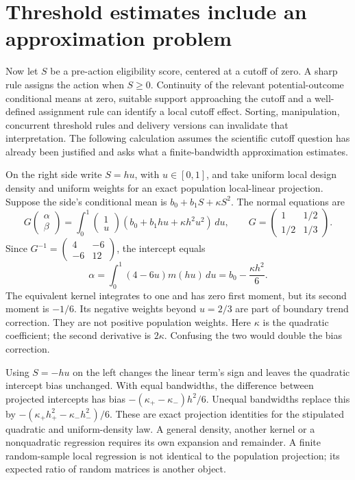 \section{Threshold estimates include an approximation problem}
\label{exec17:s4-curvature}

Now let $S$ be a pre-action eligibility score, centered at a cutoff of zero.
A sharp rule assigns the action when $S\geq0$. Continuity of the relevant
potential-outcome conditional means at zero, suitable support approaching
the cutoff and a well-defined assignment rule can identify a local cutoff
effect. Sorting, manipulation, concurrent threshold rules and delivery
versions can invalidate that interpretation. The following calculation
assumes the scientific cutoff question has already been justified and asks
what a finite-bandwidth approximation estimates.

On the right side write $S=hu$, with $u\in[0,1]$, and take uniform local
design density and uniform weights for an exact population local-linear
projection. Suppose the side's conditional mean is
$b_0+b_1S+\kappa S^2$. The normal equations are
\[
 G\begin{pmatrix}\alpha\\\beta\end{pmatrix}
 =\int_0^1\begin{pmatrix}1\\u\end{pmatrix}
       (b_0+b_1hu+\kappa h^2u^2)\,du,
 \qquad
 G=\begin{pmatrix}1&1/2\\1/2&1/3\end{pmatrix}.
\]
Since $G^{-1}=\left(\begin{smallmatrix}4&-6\\-6&12\end{smallmatrix}\right)$,
the intercept equals
\begin{equation}
 \alpha=\int_0^1(4-6u)m(hu)\,du
        =b_0-\frac{\kappa h^2}{6}.
 \label{exec17:s4-local-bias}
\end{equation}
The equivalent kernel integrates to one and has zero first moment, but its
second moment is $-1/6$. Its negative weights beyond $u=2/3$ are part of
boundary trend correction. They are not positive population weights.
Here $\kappa$ is the quadratic coefficient; the second derivative is
$2\kappa$. Confusing the two would double the bias correction.
\citep{exec17_s4_math}

Using $S=-hu$ on the left changes the linear term's sign and leaves the
quadratic intercept bias unchanged. With equal bandwidths, the difference
between projected intercepts has bias
$-(\kappa_+-\kappa_-)h^2/6$. Unequal bandwidths replace this by
$-(\kappa_+h_+^2-\kappa_-h_-^2)/6$. These are exact projection identities
for the stipulated quadratic and uniform-density law. A general density,
another kernel or a nonquadratic regression requires its own expansion and
remainder. A finite random-sample local regression is not identical to the
population projection; its expected ratio of random matrices is another
object.

